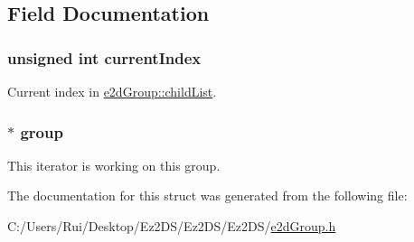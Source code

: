 \subsection{Field Documentation}
\hypertarget{structe2d_group_iterator_a932f59c8e81a171eb21af8d204d1c13d}{
\subsubsection[{current\-Index}]{\setlength{\rightskip}{0pt plus 5cm}unsigned int {\bf current\-Index}}}\label{structe2d_group_iterator_a932f59c8e81a171eb21af8d204d1c13d}
Current index in \hyperlink{structe2d_group_a55f6dde874716dc99dcd270fc0999a01}{e2d\-Group\-::child\-List}. \hypertarget{structe2d_group_iterator_a13e9c2162587f7af49d2ceb78c380444}{
\subsubsection[{group}]{$\ast$ {\bf group}}}\label{structe2d_group_iterator_a13e9c2162587f7af49d2ceb78c380444}
This iterator is working on this group. 

The documentation for this struct was generated from the following file\-:\begin{DoxyCompactItemize}
\item 
C\-:/\-Users/\-Rui/\-Desktop/\-Ez2\-D\-S/\-Ez2\-D\-S/\-Ez2\-D\-S/\hyperlink{e2d_group_8h}{e2d\-Group.\-h}\end{DoxyCompactItemize}
